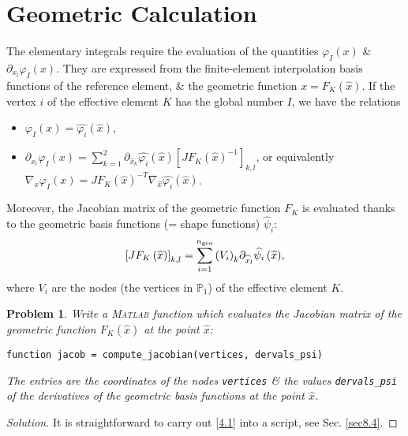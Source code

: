 \documentclass[11pt,a4paper,center,notitlepage]{article}
\numberwithin{equation}{section}
\newtheorem{prob}{Problem}[section]
\begin{document}
\section{Geometric Calculation}
The elementary integrals require the evaluation of the quantities ${\varphi _I}\left( x \right)$ \& ${\partial _{{x_l}}}{\varphi _I}\left( x \right)$. They are expressed from the finite-element interpolation basis functions of the reference element, \& the geometric function $x = {F_K}\left( {\widehat x} \right)$. If the vertex $i$ of the effective element $K$ has the global number $I$, we have the relations
\begin{itemize}
\item ${\varphi _I}\left( x \right) = \widehat {{\varphi _i}}\left( {\widehat x} \right)$, 
\item ${\partial _{{x_l}}}{\varphi _I}\left( x \right) = \sum\limits_{k = 1}^2 {{\partial _{{{\widehat x}_k}}}\widehat {{\varphi _i}}\left( {\widehat x} \right){{\left[ {J{F_K}{{\left( {\widehat x} \right)}^{ - 1}}} \right]}_{k,l}}}$, or equivalently ${\nabla _x}{\varphi _I}\left( x \right) = J{F_K}{\left( {\widehat x} \right)^{ - T}}{\nabla _{\widehat x}}\widehat {{\varphi _i}}\left( {\widehat x} \right)$.
\end{itemize}
Moreover, the Jacobian matrix of the geometric function $F_K$ is evaluated thanks to the geometric basis functions (= shape functions) ${\widehat \psi _i}$:
\begin{align}
\label{4.1}
{\left[ {J{F_K}\left( {\widehat x} \right)} \right]_{k,l}} = \sum\limits_{i = 1}^{{n_{\rm geo}}} {{{\left( {{V_i}} \right)}_k}{\partial _{{{\widehat x}_l}}}\widehat {{\psi _i}}\left( {\widehat x} \right)} ,
\end{align}
where $V_i$ are the nodes (the vertices in $\mathbb{P}_1$) of the effective element $K$.
\begin{prob}
Write a \textsc{Matlab} function which evaluates the Jacobian matrix of the geometric function ${F_K}\left( {\widehat x} \right)$ at the point $\widehat x$:
\begin{verbatim}
function jacob = compute_jacobian(vertices, dervals_psi)
\end{verbatim}
The entries are the coordinates of the nodes \verb|vertices| \& the values \verb|dervals_psi| of the derivatives of the geometric basis functions at the point $\widehat x$.
\end{prob}

\begin{proof}[Solution]
It is straightforward to carry out \eqref{4.1} into a script, see Sec. \ref{sec8.4}.
\end{proof}
\end{document}
